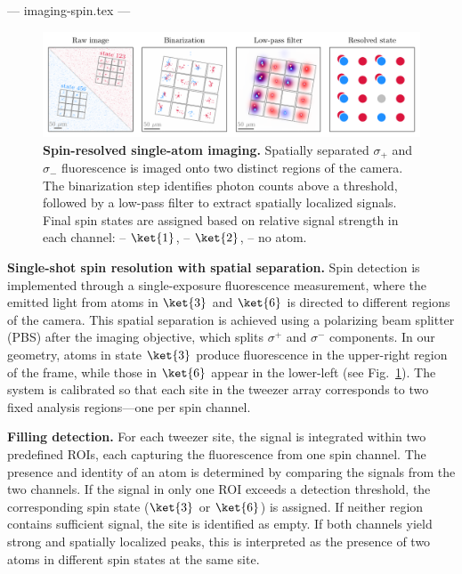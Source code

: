 --- imaging-spin.tex ---

\begin{figure}
    \centering
    \includegraphics{fig-py/imaging-spin-resolved.pdf}
    \caption{
        \textbf{Spin-resolved single-atom imaging.}
        Spatially separated $\sigma_+$ and $\sigma_-$ fluorescence is imaged onto two distinct regions of the camera. The binarization step identifies photon counts above a threshold, followed by a low-pass filter to extract spatially localized signals. Final spin states are assigned based on relative signal strength in each channel:
        \raisebox{-1pt}{\scalebox{1.5}{\textcolor{ublue}{\textbullet}}} -- $\ket{1}$, 
        \raisebox{-1pt}{\scalebox{1.5}{\textcolor{ured}{\textbullet}}} -- $\ket{2}$, 
        \raisebox{-1pt}{\scalebox{1.5}{\textcolor{uhole}{\textbullet}}} -- no atom.
    }
    \label{fig:spin-resolved}
\end{figure}


\textbf{Single-shot spin resolution with spatial separation.}  
Spin detection is implemented through a single-exposure fluorescence measurement, where the emitted light from atoms in $\ket{3}$ and $\ket{6}$ is directed to different regions of the camera. This spatial separation is achieved using a polarizing beam splitter (PBS) after the imaging objective, which splits $\sigma^+$ and $\sigma^-$ components. In our geometry, atoms in state $\ket{3}$ produce fluorescence in the upper-right region of the frame, while those in $\ket{6}$ appear in the lower-left (see Fig.~\ref{fig:spin-resolved}). The system is calibrated so that each site in the tweezer array corresponds to two fixed analysis regions—one per spin channel.

\textbf{Filling detection.}  
For each tweezer site, the signal is integrated within two predefined ROIs, each capturing the fluorescence from one spin channel. The presence and identity of an atom is determined by comparing the signals from the two channels. If the signal in only one ROI exceeds a detection threshold, the corresponding spin state ($\ket{3}$ or $\ket{6}$) is assigned. If neither region contains sufficient signal, the site is identified as empty. If both channels yield strong and spatially localized peaks, this is interpreted as the presence of two atoms in different spin states at the same site.

